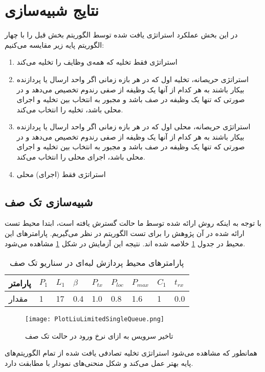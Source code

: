 \section{نتایج شبیه‌سازی}
در این بخش عملکرد استراتژی یافت شده توسط الگوریتم بخش قبل را با چهار الگوریتم پایه زیر مقایسه می‌کنیم:
\begin{enumerate}
	\item استراتژی فقط تخلیه که همه‌ی وظایف را تخلیه می‌کند
	\item استراتژی حریصانه، تخلیه اول که در هر بازه زمانی اگر واحد ارسال یا پردازنده بیکار باشند به هر کدام از آنها یک وظیفه از صفی رندوم تخصیص می‌دهد و در صورتی که تنها یک وظیفه در صف باشد و مجبور به انتخاب بین تخلیه و اجرای محلی باشد، تخلیه را انتخاب می‌کند.
	\item استراتژی حریصانه، محلی اول که در هر بازه زمانی اگر واحد ارسال یا پردازنده بیکار باشند به هر کدام از آنها یک وظیفه از صفی رندوم تخصیص می‌دهد و در صورتی که تنها یک وظیفه در صف باشد و مجبور به انتخاب بین تخلیه و اجرای محلی باشد، اجرای محلی را انتخاب می‌کند.
	\item استراتژی فقط (اجرای) محلی
\end{enumerate}
\newpage
\subsection{شبیه‌سازی تک صف}
با توجه به اینکه روش ارائه شده توسط ما حالت گسترش یافته \cite{Liu} است، ابتدا محیط تست ارائه شده در آن پژوهش را برای تست الگوریتم در نظر می‌گیریم. پارامترهای این محیط در جدول \ref{table:parameters-singlequeue} خلاصه شده اند. نتیجه این آزمایش در شکل \ref{plot:singleQueue} مشاهده می‌شود.

\begin{table}[H]
	\centering
	\begin{tabular}{@{}lllllllll@{}}
		\toprule
		\textbf{پارامتر} & $P_1$ & $L_1$ & $\beta$ & $P_{tx}$ & $P_{loc}$ & $P_{max}$ & $C_1$ & $t_{rx}$ \\ \midrule
		مقدار             & 1    & 17   & 0.4  & 1.0 & 0.8  & 1.6  & 1    & 0.0   \\ \bottomrule
	\end{tabular}
	\caption{پارامترهای محیط پردازش لبه‌ای در سناریو تک صف}
	\label{table:parameters-singlequeue}
\end{table}

\begin{figure}[H]
	\centering
	\texttt{[image: PlotLiuLimitedSingleQueue.png]}
	\caption{تاخیر سرویس به ازای نرخ ورود در حالت تک صف}
	\label{plot:singleQueue}
\end{figure}
همانطور که مشاهده می‌شود استراتژی تخلیه تصادفی یافت شده از تمام الگوریتم‌های پایه بهتر عمل می‌کند و شکل منحنی‌های نمودار با \cite{Liu} مطابقت دارد.
\newpage
